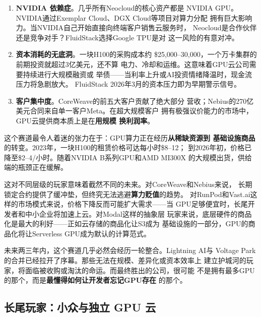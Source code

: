\begin{warnbox}
\begin{enumerate}
  \item \textbf{NVIDIA 依赖症}。几乎所有Neocloud的核心资产都是
    NVIDIA GPU。NVIDIA通过Exemplar Cloud、DGX Cloud等项目对算力分配
    拥有巨大影响力。当NVIDIA自己开始直接向终端客户销售云服务时，
    Neocloud是合作伙伴还是竞争对手？FluidStack选择Google TPU是对
    这一风险的有意对冲。
  \item \textbf{资本消耗的无底洞}。一块H100的采购成本约
    \$25,000--30,000，一个万卡集群的前期投资就超过3亿美元，还不算
    电力、冷却和运维。这意味着GPU云公司需要持续进行大规模融资或
    举债——当利率上升或AI投资情绪降温时，现金流压力将急剧放大。
    FluidStack 2026年3月的资本压力即为早期警示信号。
  \item \textbf{客户集中度}。CoreWeave的前五大客户贡献了绝大部分
    营收；Nebius的270亿美元合同来自单一客户Meta。在超大规模客户
    拥有极强议价能力的市场中，GPU云提供商本质上是在\textbf{用规模
    换利润率}。
\end{enumerate}
\end{warnbox}

这个赛道最令人着迷的张力在于：GPU算力正在经历\textbf{从稀缺资源到
基础设施商品}的转变。2023年，一块H100的租赁价格可达每小时\$8--12；
到2026年初，价格已降至\$2--4/小时。随着NVIDIA B系列GPU和AMD MI300X
的大规模出货，供给端的瓶颈正在缓解。

这对不同层级的玩家意味着截然不同的未来。对CoreWeave和Nebius来说，
长期锁定合约提供了缓冲垫，但终究无法逃避\textbf{算力贬值}的趋势。
对RunPod和Vast.ai这样的市场模式来说，价格下降反而可能扩大需求——当
GPU足够便宜时，长尾开发者和中小企业将加速上云。对Modal这样的抽象层
玩家来说，底层硬件的商品化是最大的利好——正如云存储的商品化让S3成为
基础设施的一部分，GPU的商品化将让Serverless GPU成为默认的计算范式。

未来两三年内，这个赛道几乎必然会经历一轮整合。Lightning AI与
Voltage Park的合并已经拉开了序幕。那些无法在规模、差异化或资本效率上
建立护城河的玩家，将面临被收购或淘汰的命运。而最终胜出的公司，很可能
不是拥有最多GPU的那个，而是\textbf{最懂得如何让开发者忘记GPU存在}
的那个。

\subsection{长尾玩家：小众与独立 GPU 云}
\label{subsec:gpu-cloud-longtail}

